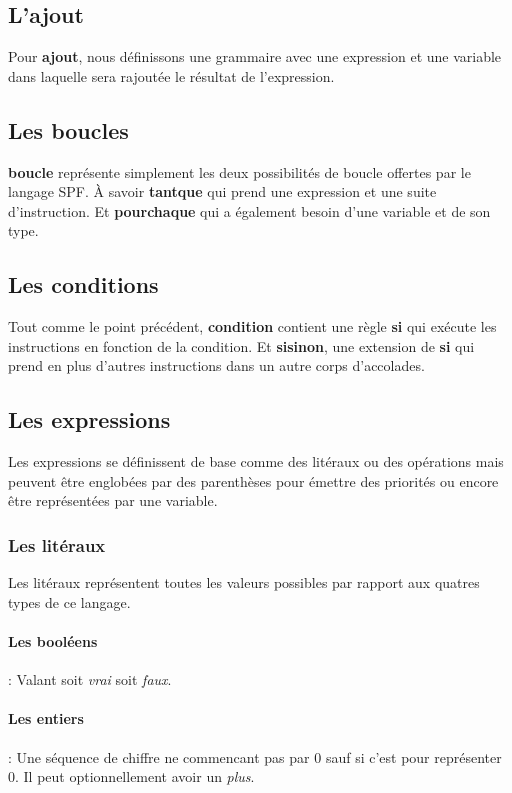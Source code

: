 \subsection{L'ajout}
Pour \textbf{ajout}, nous définissons une grammaire avec une expression et une variable dans laquelle sera rajoutée le résultat de l'expression.

\subsection{Les boucles}
\textbf{boucle} représente simplement les deux possibilités de boucle offertes par le langage SPF. À savoir \textbf{tantque} qui prend une expression et une suite d'instruction. Et \textbf{pourchaque} qui a également besoin d'une variable et de son type.

\subsection{Les conditions}
Tout comme le point précédent, \textbf{condition} contient une règle \textbf{si} qui exécute les instructions en fonction de la condition. Et \textbf{sisinon}, une extension de \textbf{si} qui prend en plus d'autres instructions dans un autre corps d'accolades.

\subsection{Les expressions}
Les expressions se définissent de base comme des litéraux ou des opérations mais peuvent être englobées par des parenthèses pour émettre des priorités ou encore être représentées par une variable.

\subsubsection{Les litéraux}
Les litéraux représentent toutes les valeurs possibles par rapport aux quatres types de ce langage.

\paragraph{Les booléens}: Valant soit \textit{vrai} soit \textit{faux}.

\paragraph{Les entiers}: Une séquence de chiffre ne commencant pas par 0 sauf si c'est pour représenter 0. Il peut optionnellement avoir un \textit{plus}.

